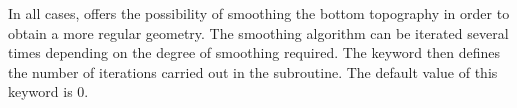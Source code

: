In all cases,  offers the possibility of smoothing the bottom
topography in order to obtain a more regular geometry.
The smoothing algorithm can be iterated several times depending on the degree of
smoothing required.
The keyword  then defines the number of
iterations carried out in the  subroutine.
The default value of this keyword is 0.
